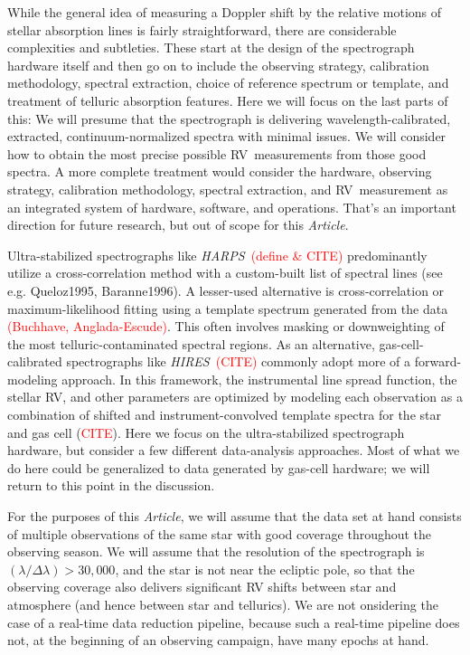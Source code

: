 \documentclass[modern]{aastex631}
\newcommand{\documentname}{\textsl{Article}}
\newcommand{\todo}[1]{\textcolor{red}{#1}}  %
\newcommand{\CITE}{\todo{CITE}}
\newcommand{\acronym}[1]{{\small{#1}}}
\newcommand{\project}[1]{\textsl{#1}}
\newcommand{\HARPS}{\project{\acronym{HARPS}}}
\newcommand{\HIRES}{\project{\acronym{HIRES}}}
\newcommand{\RV}{\acronym{RV}}
\begin{document}
While the general idea of measuring a Doppler shift by the relative
motions of stellar absorption lines is fairly straightforward, there
are considerable complexities and subtleties.
These start at the design of the spectrograph hardware itself
and then go on to include 
the observing strategy, calibration methodology, spectral extraction,
choice of reference spectrum or template, and treatment of telluric absorption
features.
Here we will focus on the last parts of this: We will presume that the
spectrograph is delivering wavelength-calibrated, extracted, continuum-normalized
spectra with minimal issues.
We will consider how to obtain the most
precise possible \RV\ measurements from those good spectra.
A more complete treatment would consider the hardware, observing strategy,
calibration methodology, spectral extraction, and \RV\ measurement as
an integrated system of hardware, software, and operations.
That's an important direction for future research, but out of scope for this \documentname.

Ultra-stabilized spectrographs like \HARPS\ \todo{(define \& \CITE)}
predominantly utilize a cross-correlation method with a custom-built
list of spectral lines (see e.g. Queloz1995, Baranne1996).
A lesser-used alternative is cross-correlation or maximum-likelihood
fitting using a template spectrum generated from the data \todo{(Buchhave,
Anglada-Escude)}.
This often involves masking or downweighting of the most
telluric-contaminated spectral regions.
As an alternative, gas-cell-calibrated spectrographs like
\HIRES\ \todo{(CITE)} commonly adopt more of a forward-modeling approach.
In this framework, the instrumental line spread function, the stellar
RV, and other parameters are optimized by modeling each observation as
a combination of shifted and instrument-convolved template spectra for
the star and gas cell (\CITE).
Here we focus on the ultra-stabilized spectrograph hardware, but consider
a few different data-analysis approaches.
Most of what we do here could be generalized to data generated by
gas-cell hardware; we will return to this point in the discussion.

For the purposes of this \documentname, we will assume that the data
set at hand consists of multiple observations of the same star with
good coverage throughout the observing season.
We will assume that the resolution of the spectrograph is $(\lambda /
\Delta\lambda) > 30,000$, and the star is not near the ecliptic pole,
so that the observing coverage also delivers significant RV shifts
between star and atmosphere (and hence between star and tellurics).
We are not onsidering the case of a real-time data reduction pipeline,
because such a real-time pipeline does not, at the beginning of an
observing campaign, have many epochs at hand.
\end{document}
